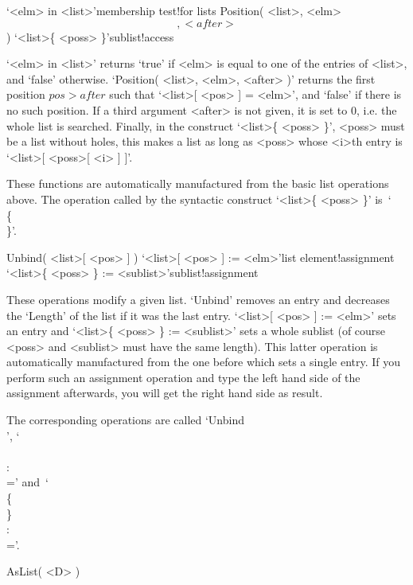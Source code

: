 \>`<elm> in <list>'{membership test}!{for lists}
\>Position( <list>, <elm> \[, <after> \] )
\>`<list>\{ <poss> \}'{sublist!access}

`<elm> in <list>' returns `true' if <elm> is equal to  one of the entries
of  <list>, and `false'  otherwise. `Position( <list>,  <elm>, <after> )'
returns the first position $pos  > after$  such  that `<list>[ <pos> ]  =
<elm>', and `false' if  there is no  such  position. If a third  argument
<after> is  not given, it is  set to 0, i.e.  the whole list is searched.
Finally, in  the construct `<list>\{  <poss> \}',  <poss> must  be a list
without holes, this makes a  list as long as <poss>  whose <i>th entry is
`<list>[ <poss>[ <i> ] ]'.

These functions are   automatically   manufactured from the  basic   list
operations  above. The  operation   called  by the   syntactic  construct
`<list>\{ <poss> \}' is~`\\\{\\\}'.

\>Unbind( <list>[ <pos> ] )
\>`<list>[ <pos> ] := <elm>'{list element!assignment}
\>`<list>\{ <poss> \} := <sublist>'{sublist!assignment}

These   operations modify a  given  list.  `Unbind'  removes an entry and
decreases  the `Length' of the list  if it was  the  last entry. `<list>[
<pos> ]  := <elm>' sets an  entry  and `<list>\{ <poss> \}  := <sublist>'
sets a whole sublist  (of course <poss> and <sublist>  must have the same
length). This latter operation is automatically manufactured from the one
before  which sets a  single entry.  If  you  perform such an  assignment
operation and type  the left hand side of  the assignment afterwards, you
will get the right hand side as result.

The  corresponding  operations are  called `Unbind\\[\\]', `\\[\\]\\:\\='
and~`\\\{\\\}\\:\\='.

\null

\>AsList( <D> )

